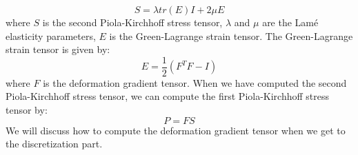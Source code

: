 \documentclass[acmtog]{acmart}
\begin{document}
\begin{equation*}
    S = \lambda tr(E)I + 2\mu E
\end{equation*}
where $S$ is the second Piola-Kirchhoff stress tensor, $\lambda$ and $\mu$ are the Lam\'e elasticity parameters, $E$ is the Green-Lagrange strain tensor. The Green-Lagrange strain tensor is given by:
\begin{equation*}
    E = \frac{1}{2}(F^TF - I)
\end{equation*}
where $F$ is the deformation gradient tensor. When we have computed the second Piola-Kirchhoff stress tensor, we can compute the first Piola-Kirchhoff stress tensor by:
\begin{equation*}
    P = F S
\end{equation*}
We will discuss how to compute the deformation gradient tensor when we get to the discretization part.
\end{document}
